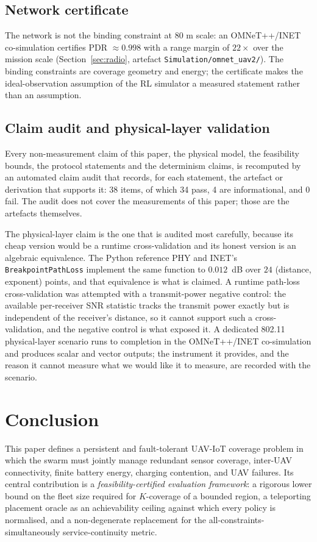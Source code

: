 \documentclass[conference]{IEEEtran}
\newcommand{\tokAuditFail}{0}
\newcommand{\tokAuditInfo}{4}
\newcommand{\tokAuditItems}{38}
\newcommand{\tokAuditPass}{34}
\newcommand{\tokPhyDelta}{0.012}
\newcommand{\tokPhyRows}{24}
\begin{document}
\subsection{Network certificate}
\label{sec:results_network}

The network is not the binding constraint at 80 m scale: an OMNeT++/INET
co-simulation certifies PDR $\approx 0.998$ with a range margin of $22\times$
over the mission scale (Section~\ref{sec:radio}, artefact
\texttt{Simulation/omnet\_uav2/}).  The binding constraints are coverage geometry and
energy; the certificate makes the ideal-observation assumption of the RL
simulator a measured statement rather than an assumption.

\subsection{Claim audit and physical-layer validation}
\label{sec:validation}

Every non-measurement claim of this paper, the physical model, the
feasibility bounds, the protocol statements and the determinism claims, is
recomputed by an automated claim audit that records, for each statement, the
artefact or derivation that supports it: \tokAuditItems{} items, of which
\tokAuditPass{} pass, \tokAuditInfo{} are informational, and \tokAuditFail{}
fail.  The audit does not cover the measurements of this paper; those are the
artefacts themselves.

The physical-layer claim is the one that is audited most carefully, because
its cheap version would be a runtime cross-validation and its honest version
is an algebraic equivalence.  The Python reference PHY and INET's
\texttt{BreakpointPathLoss} implement the same function to $\tokPhyDelta$~dB
over $\tokPhyRows$ (distance, exponent) points, and that equivalence is what
is claimed.  A runtime path-loss cross-validation was attempted with a
transmit-power negative control: the available per-receiver SNR statistic
tracks the transmit power exactly but is independent of the receiver's
distance, so it cannot support such a cross-validation, and the negative
control is what exposed it.  A dedicated 802.11 physical-layer scenario runs
to completion in the OMNeT++/INET co-simulation and produces scalar and vector
outputs; the instrument it provides, and the reason it cannot measure what we
would like it to measure, are recorded with the scenario.

\section{Conclusion}
This paper defines a persistent and fault-tolerant UAV-IoT coverage problem in which the swarm must jointly manage redundant sensor coverage, inter-UAV connectivity, finite battery energy, charging contention, and UAV failures. Its central contribution is a \emph{feasibility-certified evaluation framework}: a rigorous lower bound on the fleet size required for $K$-coverage of a bounded region, a teleporting placement oracle as an achievability ceiling against which every policy is normalised, and a non-degenerate replacement for the all-constraints-simultaneously service-continuity metric.
\end{document}
